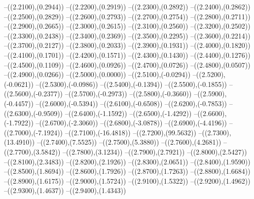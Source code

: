 {	--({\sx*(2.2100)},{\sy*(0.2944)})
	--({\sx*(2.2200)},{\sy*(0.2919)})
	--({\sx*(2.2300)},{\sy*(0.2892)})
	--({\sx*(2.2400)},{\sy*(0.2862)})
	--({\sx*(2.2500)},{\sy*(0.2829)})
	--({\sx*(2.2600)},{\sy*(0.2793)})
	--({\sx*(2.2700)},{\sy*(0.2754)})
	--({\sx*(2.2800)},{\sy*(0.2711)})
	--({\sx*(2.2900)},{\sy*(0.2665)})
	--({\sx*(2.3000)},{\sy*(0.2615)})
	--({\sx*(2.3100)},{\sy*(0.2560)})
	--({\sx*(2.3200)},{\sy*(0.2502)})
	--({\sx*(2.3300)},{\sy*(0.2438)})
	--({\sx*(2.3400)},{\sy*(0.2369)})
	--({\sx*(2.3500)},{\sy*(0.2295)})
	--({\sx*(2.3600)},{\sy*(0.2214)})
	--({\sx*(2.3700)},{\sy*(0.2127)})
	--({\sx*(2.3800)},{\sy*(0.2033)})
	--({\sx*(2.3900)},{\sy*(0.1931)})
	--({\sx*(2.4000)},{\sy*(0.1820)})
	--({\sx*(2.4100)},{\sy*(0.1701)})
	--({\sx*(2.4200)},{\sy*(0.1571)})
	--({\sx*(2.4300)},{\sy*(0.1430)})
	--({\sx*(2.4400)},{\sy*(0.1276)})
	--({\sx*(2.4500)},{\sy*(0.1109)})
	--({\sx*(2.4600)},{\sy*(0.0926)})
	--({\sx*(2.4700)},{\sy*(0.0726)})
	--({\sx*(2.4800)},{\sy*(0.0507)})
	--({\sx*(2.4900)},{\sy*(0.0266)})
	--({\sx*(2.5000)},{\sy*(0.0000)})
	--({\sx*(2.5100)},{\sy*(-0.0294)})
	--({\sx*(2.5200)},{\sy*(-0.0621)})
	--({\sx*(2.5300)},{\sy*(-0.0986)})
	--({\sx*(2.5400)},{\sy*(-0.1394)})
	--({\sx*(2.5500)},{\sy*(-0.1855)})
	--({\sx*(2.5600)},{\sy*(-0.2377)})
	--({\sx*(2.5700)},{\sy*(-0.2973)})
	--({\sx*(2.5800)},{\sy*(-0.3660)})
	--({\sx*(2.5900)},{\sy*(-0.4457)})
	--({\sx*(2.6000)},{\sy*(-0.5394)})
	--({\sx*(2.6100)},{\sy*(-0.6508)})
	--({\sx*(2.6200)},{\sy*(-0.7853)})
	--({\sx*(2.6300)},{\sy*(-0.9509)})
	--({\sx*(2.6400)},{\sy*(-1.1592)})
	--({\sx*(2.6500)},{\sy*(-1.4292)})
	--({\sx*(2.6600)},{\sy*(-1.7922)})
	--({\sx*(2.6700)},{\sy*(-2.3060)})
	--({\sx*(2.6800)},{\sy*(-3.0878)})
	--({\sx*(2.6900)},{\sy*(-4.4196)})
	--({\sx*(2.7000)},{\sy*(-7.1924)})
	--({\sx*(2.7100)},{\sy*(-16.4818)})
	--({\sx*(2.7200)},{\sy*(99.5632)})
	--({\sx*(2.7300)},{\sy*(13.4910)})
	--({\sx*(2.7400)},{\sy*(7.5525)})
	--({\sx*(2.7500)},{\sy*(5.3880)})
	--({\sx*(2.7600)},{\sy*(4.2681)})
	--({\sx*(2.7700)},{\sy*(3.5842)})
	--({\sx*(2.7800)},{\sy*(3.1234)})
	--({\sx*(2.7900)},{\sy*(2.7921)})
	--({\sx*(2.8000)},{\sy*(2.5427)})
	--({\sx*(2.8100)},{\sy*(2.3483)})
	--({\sx*(2.8200)},{\sy*(2.1926)})
	--({\sx*(2.8300)},{\sy*(2.0651)})
	--({\sx*(2.8400)},{\sy*(1.9590)})
	--({\sx*(2.8500)},{\sy*(1.8694)})
	--({\sx*(2.8600)},{\sy*(1.7926)})
	--({\sx*(2.8700)},{\sy*(1.7263)})
	--({\sx*(2.8800)},{\sy*(1.6684)})
	--({\sx*(2.8900)},{\sy*(1.6175)})
	--({\sx*(2.9000)},{\sy*(1.5724)})
	--({\sx*(2.9100)},{\sy*(1.5322)})
	--({\sx*(2.9200)},{\sy*(1.4962)})
	--({\sx*(2.9300)},{\sy*(1.4637)})
	--({\sx*(2.9400)},{\sy*(1.4343)})
}

